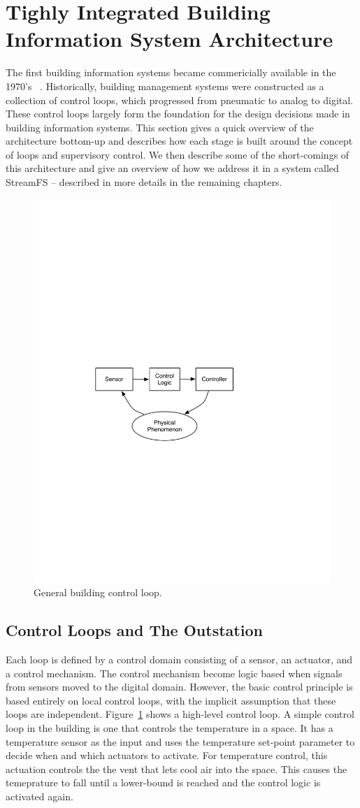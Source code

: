 \section{Tighly Integrated Building Information System Architecture}

The first building information systems became commericially available in the 1970's ~\cite{gardner1987energy}.  
Historically, building management 
systems were constructed as a collection of control loops, which progressed from pneumatic to analog to digital.
These control loops largely form the foundation for the design decisions made in building information systems.  
This section gives a quick overview of the architecture bottom-up and describes how each stage is built around
the concept of loops and supervisory control.  We then describe some of the short-comings of this architecture
and give an overview of how we address it in a system called StreamFS -- described in more details in
the remaining chapters.

\begin{figure}[t!] %
\centering
\includegraphics[width=0.50\columnwidth]{figs/control_loop}
\caption{General building control loop.}
\label{fig:control_loop}
\end{figure}

\subsection{Control Loops and The Outstation}
\label{sec:control_loops}
Each loop is defined by a control domain consisting of a sensor, an actuator, and a control mechanism.  The control mechanism
become logic based when signals from sensors moved to the digital domain.  However, the basic control principle is based
entirely on local control loops, with the implicit assumption that these loops are independent.
Figure~\ref{fig:control_loop} shows a high-level control loop.  A simple control loop in the building is one that controls
the temperature in a space.  It has a temperature sensor as the input and uses the temperature set-point parameter to 
decide when and which actuators to activate.
For temperature control, this actuation controls the the vent that lets cool air into the space.  This causes the temeprature
to fall until a lower-bound is reached and the control logic is activated again.

